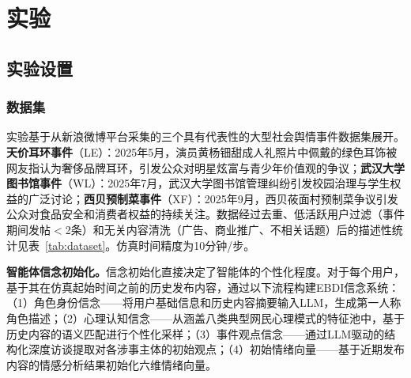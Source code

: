 \documentclass[lettersize,journal]{IEEEtran}
\begin{document}
\section{实验}
\label{sec:exp}

\subsection{实验设置}

\subsubsection{数据集}

实验基于从新浪微博平台采集的三个具有代表性的大型社会舆情事件数据集展开。\textbf{天价耳环事件}（LE）：2025年5月，演员黄杨钿甜成人礼照片中佩戴的绿色耳饰被网友指认为奢侈品牌耳环，引发公众对明星炫富与青少年价值观的争议；\textbf{武汉大学图书馆事件}（WL）：2025年7月，武汉大学图书馆管理纠纷引发校园治理与学生权益的广泛讨论；\textbf{西贝预制菜事件}（XF）：2025年9月，西贝莜面村预制菜争议引发公众对食品安全和消费者权益的持续关注。数据经过去重、低活跃用户过滤（事件期间发帖$<$2条）和无关内容清洗（广告、商业推广、不相关话题）后的描述性统计见表~\ref{tab:dataset}。仿真时间精度为10分钟/步。

\textbf{智能体信念初始化。}信念初始化直接决定了智能体的个性化程度。对于每个用户，基于其在仿真起始时间之前的历史发布内容，通过以下流程构建EBDI信念系统：（1）角色身份信念——将用户基础信息和历史内容摘要输入LLM，生成第一人称角色描述；（2）心理认知信念——从涵盖八类典型网民心理模式的特征池中，基于历史内容的语义匹配进行个性化采样；（3）事件观点信念——通过LLM驱动的结构化深度访谈提取对各涉事主体的初始观点；（4）初始情绪向量——基于近期发布内容的情感分析结果初始化六维情绪向量。

\begin{table}[!t]
\centering
\caption{三个舆情事件数据集的描述性统计}
\label{tab:dataset}
\renewcommand{\arraystretch}{1.0}
\end{table}
\end{document}
